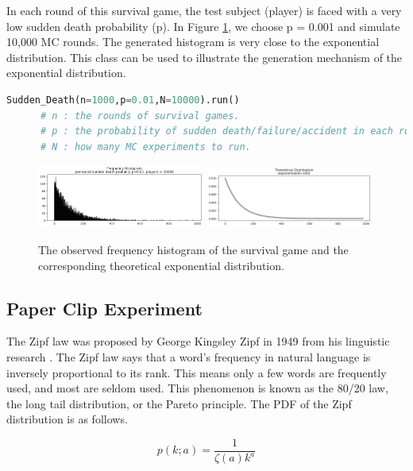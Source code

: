 \documentclass[11pt, letterpaper]{article}
\begin{document}
In each round of this survival game, the test subject (player) is faced with a very
low sudden death probability (p). In Figure \ref{fig:exponential mc}, we choose p = 0.001 and
simulate 10,000 MC rounds. The generated histogram is very close to the exponential distribution.
This class can be used to illustrate the generation mechanism of the exponential distribution.

\lstset{
    basicstyle=\footnotesize,
    xleftmargin=-3em,aboveskip=0.5em,belowskip=0.5em
}
\begin{lstlisting}[language=python]
      Sudden_Death(n=1000,p=0.01,N=10000).run()
      # n : the rounds of survival games.
      # p : the probability of sudden death/failure/accident in each round.
      # N : how many MC experiments to run.
      \end{lstlisting}

\begin{figure}[htbp]
    \centering
    \includegraphics[width=0.49\textwidth]{fig3-exponential mc1.png}
    \includegraphics[width=0.49\textwidth]{fig3-exponential mc2.png}
    \caption{The observed frequency histogram of the survival game and the corresponding theoretical exponential distribution.}
    \label{fig:exponential mc}
\end{figure}

\subsection{Paper Clip Experiment}
The Zipf law was proposed by George Kingsley Zipf in 1949 from his linguistic research \cite{bib14}.
The Zipf law says that a word's frequency in natural language is inversely proportional
to its rank. This means only a few words are frequently used, and most are seldom used.
This phenomenon is known as the 80/20 law, the long tail distribution, or the Pareto principle.
The PDF of the Zipf distribution is as follows.

\begin{equation}
    \label{deqn_ex2}
    p(k;a)=\frac{1}{\zeta(a)k^{a}}
\end{equation}
\end{document}
